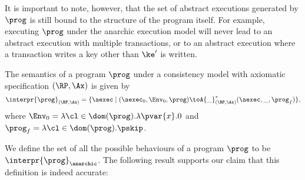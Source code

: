 \begin{example}
\begin{center}
\end{center}

It is important to note, however, that the set of abstract executions generated by $\prog$ is still bound 
to the structure of the program itself. For example, executing $\prog$ under the anarchic execution model 
will never lead to an abstract execution with multiple transactions, or to an abstract execution where a transaction 
writes a key other than $\ke'$ is written.
\end{example}

\begin{definition}
The semantics of a program $\prog$ under a consistency model with axiomatic specification 
$(\RP, \Ax)$ is given by 
\[
\interpr{\prog}_{(\RP, \Ax)} = \{ \aexec \mid (\aexec_{0}, \Env_{0}, \prog) \toA{\_}_{(\RP, \Ax)}^{\ast} (\aexec, \_, \prog_{f}) \}, 
\]
where $\Env_{0} = \lambda \cl \in \dom(\prog).\lambda \pvar{x}.0$ and $\prog_{f} = \lambda \cl \in \dom(\prog).\pskip$.
\end{definition}

We define the set of all the possible behaviours of a program $\prog$ to be $\interpr{\prog}_{\anarchic}$. 
The following result supports our claim that this definition is indeed accurate: 

